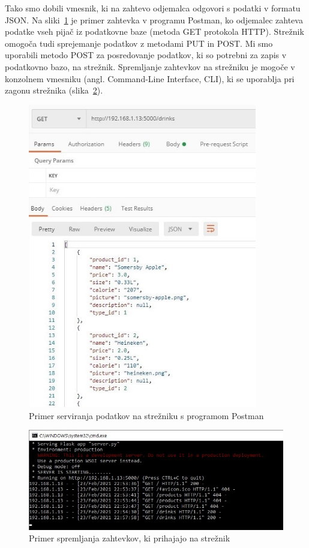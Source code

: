 \documentclass[a4paper, 12pt]{book}
\begin{document}
Tako smo dobili vmesnik, ki na zahtevo odjemalca odgovori s podatki v formatu JSON. Na sliki~\ref{ServerEX} je primer zahtevka v programu Postman, ko odjemalec zahteva podatke vseh pijač iz podatkovne baze (metoda GET protokola HTTP). Strežnik omogoča tudi sprejemanje podatkov z metodami PUT in POST. Mi smo uporabili metodo POST za posredovanje podatkov, ki so potrebni za zapis v podatkovno bazo, na strežnik. Spremljanje zahtevkov na strežniku je mogoče v konzolnem vmesniku (angl. Command-Line Interface, CLI), ki se uporablja pri zagonu strežnika (slika~\ref{ServerEX2}).

\begin{figure}[!htb]   
\begin{center}
\includegraphics[width=10cm]{Server_example.jpg}
\caption{Primer serviranja podatkov na strežniku s programom Postman}
\label{ServerEX}
\end{center}
\end{figure}

\begin{figure}[!htb]
\centering
\includegraphics[width=13cm]{Server_example_2.jpg}
\caption{Primer spremljanja zahtevkov, ki prihajajo na strežnik}
\label{ServerEX2}
\end{figure}
\end{document}
